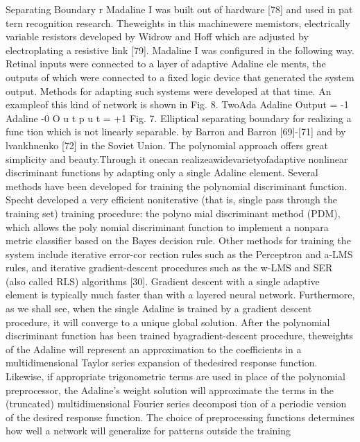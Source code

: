 \documentclass[11pt,a4paper,twocolumn]{article}
\begin{document}
\newpage


Separating 
Boundary 
r 
Madaline I was built out of hardware [78] and used in pat
tern recognition research. Theweights in this machinewere 
memistors, electrically variable resistors developed by 
Widrow and Hoff which are adjusted by electroplating a 
resistive link [79]. 
Madaline I was configured in the following way. Retinal 
inputs were connected to a layer of adaptive Adaline ele
ments, the outputs of which were connected to a fixed logic 
device that generated the system output. Methods for 
adapting such systems were developed at that time. An 
exampleof this kind of network is shown in Fig. 8. TwoAda
Adaline 
Output = -1 
Adaline 
-0 
O u t p u t =  +1 
Fig. 7. Elliptical separating boundary for realizing a func
tion which is not linearly separable. 
by Barron and Barron [69]-[71] and by lvankhnenko [72] in 
the Soviet Union. 
The polynomial approach offers great simplicity and 
beauty.Through it onecan realizeawidevarietyofadaptive 
nonlinear discriminant functions by adapting only a single 
Adaline element. Several methods have been developed for 
training the polynomial discriminant function. Specht 
developed a very efficient noniterative (that is, single pass 
through the training set) training procedure: the polyno
mial discriminant method (PDM), which allows the poly
nomial discriminant function to implement a nonpara
metric classifier based on the Bayes decision rule. Other 
methods for training the system include iterative error-cor
rection rules such as the Perceptron and a-LMS rules, and 
iterative gradient-descent procedures such as the w-LMS 
and SER (also called RLS) algorithms [30]. Gradient descent 
with a single adaptive element is typically much faster than 
with a layered neural network. Furthermore, as we shall see, 
when the single Adaline is trained by a gradient descent 
procedure, it will converge to a unique global solution. 
After the polynomial discriminant function has been 
trained byagradient-descent procedure, theweights of the 
Adaline will represent an approximation to the coefficients 
in a multidimensional Taylor series expansion of thedesired 
response function. Likewise, if appropriate trigonometric 
terms are used in place of the polynomial preprocessor, the 
Adaline's weight solution will approximate the terms in the 
(truncated) multidimensional Fourier series decomposi
tion of a periodic version of the desired response function. 
The choice of preprocessing functions determines how well 
a network will generalize for patterns outside the training 
\end{document}
